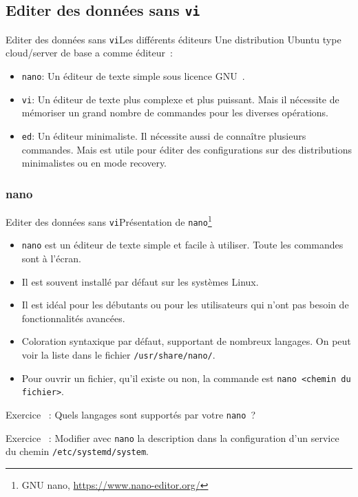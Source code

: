 \documentclass{beamer}
\begin{document}
    \subsection{Editer des données sans \lstinline{vi}}\label{subsec:edit-whithout-vi}


    \begin{frame}{Editer des données sans \lstinline{vi}}{Les différents éditeurs}
        Une distribution Ubuntu type cloud/server de base a comme éditeur~:
        \begin{itemize}
            \item \lstinline{nano}: Un éditeur de texte simple sous licence GNU~.
            \item \lstinline{vi}: Un éditeur de texte plus complexe et plus puissant.
            Mais il nécessite de mémoriser un grand nombre de commandes pour les diverses opérations.
            \item \lstinline{ed}: Un éditeur minimaliste.
            Il nécessite aussi de connaître plusieurs commandes.
            Mais est utile pour éditer des configurations sur des distributions minimalistes ou en mode recovery.
        \end{itemize}
    \end{frame}

    \subsubsection{nano}\label{subsubsec:nano}
    \begin{frame}{Editer des données sans \lstinline{vi}}{Présentation de \lstinline{nano}\footnote{\label{nano}GNU nano, \url{https://www.nano-editor.org/}}}
        \begin{itemize}
            \item \lstinline{nano} est un éditeur de texte simple et facile à utiliser.
            Toute les commandes sont à l'écran.
            \item Il est souvent installé par défaut sur les systèmes Linux.
            \item Il est idéal pour les débutants ou pour les utilisateurs qui n'ont pas besoin de fonctionnalités avancées.
            \item Coloration syntaxique par défaut, supportant de nombreux langages.
            On peut voir la liste dans le fichier \lstinline{/usr/share/nano/}.
            \item Pour ouvrir un fichier, qu'il existe ou non, la commande est \lstinline{nano <chemin du fichier>}.
        \end{itemize}
        Exercice \execcounterdispinc~: Quels langages sont supportés par votre \lstinline{nano}~?

        Exercice \execcounterdispinc~: Modifier avec \lstinline{nano} la description dans la configuration d'un service du chemin \lstinline{/etc/systemd/system}.
    \end{frame}
\end{document}
